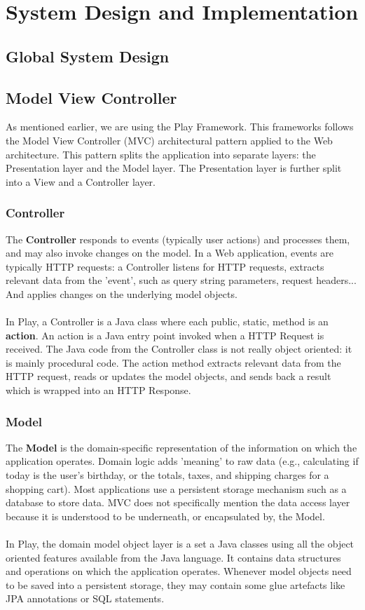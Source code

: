 \chapter{System Design and Implementation}

\section{Global System Design}

\section{Model View Controller}
As mentioned earlier, we are using the Play Framework. 
This frameworks follows the Model View Controller (MVC) architectural pattern applied to the Web architecture\cite{playframework_mvc}.
This pattern splits the application into separate layers: the Presentation layer and the Model layer. 
The Presentation layer is further split into a View and a Controller layer.

\subsection{Controller}
The \textbf{Controller} responds to events (typically user actions) and processes them, and may also invoke changes on the model.
In a Web application, events are typically HTTP requests: a Controller listens for HTTP requests, extracts relevant data from the 'event', such as query string parameters, request headers... 
And applies changes on the underlying model objects.
\\\\
In Play, a Controller is a Java class where each public, static, method is an \textbf{action}.
An action is a Java entry point invoked when a HTTP Request is received.
The Java code from the Controller class is not really object oriented: it is mainly procedural code.
The action method extracts relevant data from the HTTP request, reads or updates the model objects, and sends back a result which is wrapped into an HTTP Response.

\subsection{Model}
The \textbf{Model} is the domain-specific representation of the information on which the application operates.
Domain logic adds 'meaning' to raw data (e.g., calculating if today is the user's birthday, or the totals, taxes, and shipping charges for a shopping cart).
 Most applications use a persistent storage mechanism such as a database to store data.
MVC does not specifically mention the data access layer because it is understood to be underneath, or encapsulated by, the Model.
\\\\
In Play, the domain model object layer is a set a Java classes using all the object oriented features available from the Java language. 
It contains data structures and operations on which the application operates. 
Whenever model objects need to be saved into a persistent storage, they may contain some glue artefacts like JPA annotations or SQL statements.

